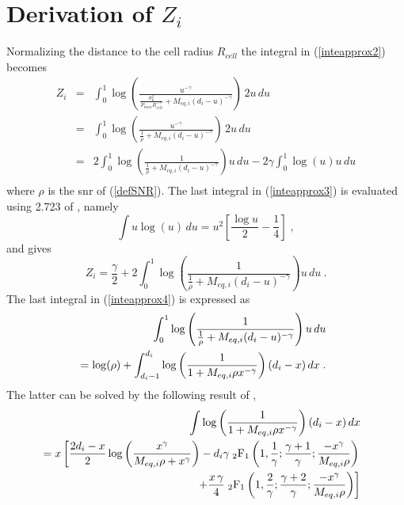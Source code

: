 \section{Derivation of $Z_i$}

Normalizing the distance to the cell radius $R_{cell}$ the integral in (\ref{inteapprox2}) becomes
\begin{eqnarray}
        Z_i&\!\!\!=\!\!\!& \int_0^{1}\log\left(\frac{u^{-\gamma}}{\frac{\sigma_n^2}{P_{max}R_{cell}^{-\gamma}}+M_{eq,i}(d_i-u)^{-\gamma}}\right)\,2u\,du\nonumber\\
        &\!\!\!=\!\!\!& \int_0^{1}\log\left(\frac{u^{-\gamma}}{\frac{1}{\rho}+M_{eq,i}(d_i-u)^{-\gamma}}\right)\,2u\,du\nonumber \\
        &\!\!\!=\!\!\!& 2 \int_0^1 \log\left(\frac{1}{\frac{1}{\rho}+M_{eq,i}(d_i-u)^{-\gamma}}\right) u \, du -2\gamma \int_0^1 \log(u) u \, du \nonumber\\[-3mm]
\label{inteapprox3}
\end{eqnarray}
where $\rho$ is the \gls{snr} of (\ref{defSNR}).
The last integral in (\ref{inteapprox3}) is evaluated using 2.723 of \cite{gradshteyn00}, namely
\begin{equation}
  \int u \log(u)\, du = u^2\left[\frac{\log u}{2}-\frac{1}{4}\right]\;,
\end{equation}
and gives
\begin{equation}
      Z_i=\frac{\gamma}{2}+ 2 \int_0^1 \log\left(\frac{1}{\frac{1}{\rho}+M_{eq,i}(d_i-u)^{-\gamma}}\right) u \, du  \:.\label{inteapprox4}
\end{equation}
The last integral in (\ref{inteapprox4}) is expressed as
\begin{eqnarray}
	&&\hspace*{-5mm}\int_0^1 \log\left(\frac{1}{\frac{1}{\rho}+M_{eq,i}(d_i-u)^{-\gamma}}\right) u \, du\nonumber\\
        &&\hspace*{-5mm}= \log(\rho)+ \int_{d_i-1}^{d_i} \log\left(\frac{1}{1+M_{eq,i}\rho x ^{-\gamma}}\right) (d_i-x) \, dx\;.
\end{eqnarray}
The latter can be solved by the following result of \cite{Wolfram}, 
\begin{eqnarray}
   &&\hspace*{-6mm}\int\log\left(\frac{1}{1+M_{eq,i}\rho x ^{-\gamma}}\right) (d_i-x) \, dx \nonumber\\
   &&\hspace*{-6mm}= x\left[\frac{2d_i-x}{2}\log\left(\frac{x^\gamma}{M_{eq,i}\rho+x^\gamma}\right)
  -d_i\gamma\;\mbox{$_2$F$_1$}\left(1,\frac{1}{\gamma};\frac{\gamma+1}{\gamma};\frac{-x^\gamma}{M_{eq,i}\rho}\right)
\right.\nonumber\\
&&\left.
+\frac{x\,\gamma}{4} \;\mbox{$_2$F$_1$}\left(1,\frac{2}{\gamma};\frac{\gamma+2}{\gamma};\frac{-x^\gamma}{M_{eq,i}\rho}\right)\right]
\end{eqnarray}
